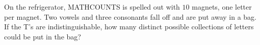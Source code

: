 On the refrigerator, MATHCOUNTS is spelled out with $10$ magnets, one letter per magnet. Two vowels and three consonants fall off and are put away in a bag. If the T's are indistinguishable, how many distinct possible collections of letters could be put in the bag?
